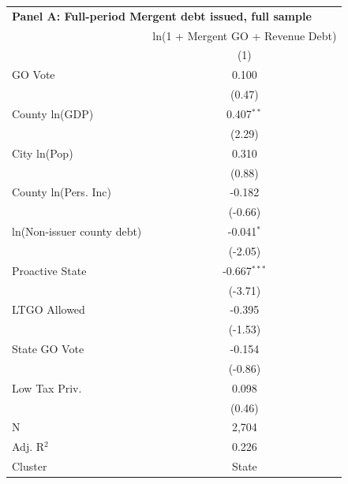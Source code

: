 \begingroup
\centering
\begin{tabular*}{\textwidth}{@{\extracolsep{\fill}}lc}
\multicolumn{2}{l}{\textbf{Panel A: Full-period Mergent debt issued, full sample}}\\

\addlinespace
   \toprule
                              & ln(1 + Mergent GO + Revenue Debt)\\  
                              & (1)\\  
   \midrule 
   GO Vote                    & 0.100\\   
                              & (0.47)\\   
   County ln(GDP)             & 0.407$^{**}$\\   
                              & (2.29)\\   
   City ln(Pop)               & 0.310\\   
                              & (0.88)\\   
   County ln(Pers. Inc)       & -0.182\\   
                              & (-0.66)\\   
   ln(Non-issuer county debt) & -0.041$^{*}$\\   
                              & (-2.05)\\   
   Proactive State            & -0.667$^{***}$\\   
                              & (-3.71)\\   
   LTGO Allowed               & -0.395\\   
                              & (-1.53)\\   
   State GO Vote              & -0.154\\   
                              & (-0.86)\\   
   Low Tax Priv.              & 0.098\\   
                              & (0.46)\\   
   \hline
   N               & 2,704\\  
   Adj. R$^2$             & 0.226\\  
   Cluster              & State\\  
   \bottomrule
\end{tabular*}
\par\endgroup
